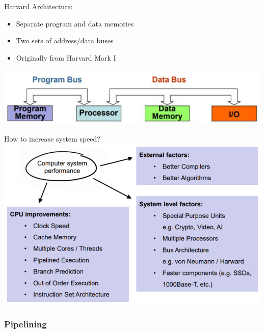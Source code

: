 \begin{definition}{Harvard Architecture:}
\begin{itemize}
  \item Separate program and data memories
  \item Two sets of address/data buses
  \item Originally from Harvard Mark I
\end{itemize}

\includegraphics[width=0.7\linewidth]{images/2024_12_29_79e6b22f503fb7b4f718g-13(2)}
\end{definition}

\begin{theorem}{How to increase system speed?}\\
  \includegraphics[width=\linewidth]{images/howtoincrease.png}
\end{theorem}

\subsubsection{Pipelining}


